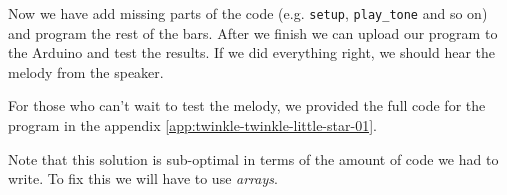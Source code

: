 \documentclass[../sparc.tex]{subfiles}
\begin{document}
Now we have add missing parts of the code (e.g. \texttt{setup},
\texttt{play\_tone} and so on) and program the rest of the bars.  After we
finish we can upload our program to the Arduino and test the results.  If we did
everything right, we should hear the melody from the speaker.

For those who can't wait to test the melody, we provided the full code for the
program in the appendix \ref{app:twinkle-twinkle-little-star-01}.

Note that this solution is sub-optimal in terms of the amount of code we had to
write.  To fix this we will have to use \emph{arrays}.
\end{document}
